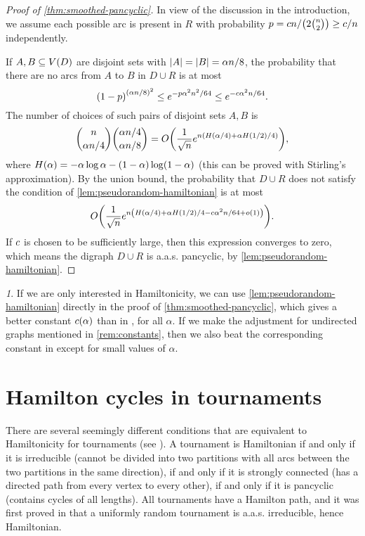 \documentclass[11pt,english]{article}
\theoremstyle{plain}
\theoremstyle{definition}
\theoremstyle{definition}
\theoremstyle{plain}
\theoremstyle{plain}
\theoremstyle{plain}
\theoremstyle{plain}
\theoremstyle{remark}
\newtheorem{rem}[thm]{\protect\remarkname}
\theoremstyle{remark}
\let\originalleft\left
\let\originalright\right
\renewcommand{\left}{\mathopen{}\mathclose\bgroup\originalleft}
\renewcommand{\right}{\aftergroup\egroup\originalright}
\providecommand{\remarkname}{Remark}
\begin{document}
\begin{proof}
[Proof of \ref{thm:smoothed-pancyclic}]In view of the discussion
in the introduction, we assume each possible arc is present in $R$
with probability $p=\cdi n/\left(2{n \choose 2}\right)\ge\cdi/n$ independently.

If $A,B\subseteq V\left(D\right)$ are disjoint sets with $\left|A\right|=\left|B\right|=\alpha n/8$,
the probability that there are no arcs from $A$ to $B$ in $D\cup R$
is at most
\[
\left(1-p\right)^{\left(\alpha n/8\right)^{2}}\le e^{-p\alpha^{2}n^{2}/64}\le e^{-\cdi\alpha^{2}n/64}.
\]
The number of choices of such pairs of disjoint sets $A,B$ is
\[
{n \choose \alpha n/4}{\alpha n/4 \choose \alpha n/8}=O\left(\frac{1}{\sqrt{n}}e^{n\left(H\left(\alpha/4\right)+\alpha H\left(1/2\right)/4\right)}\right),
\]
where $H\left(\alpha\right)=-\alpha\log\alpha-\left(1-\alpha\right)\log\left(1-\alpha\right)$
(this can be proved with Stirling's approximation). By the union bound,
the probability that $D\cup R$ does not satisfy the condition of
\ref{lem:pseudorandom-hamiltonian} is at most
\[
O\left(\frac{1}{\sqrt{n}}e^{n\left(H\left(\alpha/4\right)+\alpha H\left(1/2\right)/4-\cdi\alpha^{2}n/64+o\left(1\right)\right)}\right).
\]
If $c$ is chosen to
be sufficiently large, then this expression converges to zero, which means the digraph $D\cup R$ is a.a.s. pancyclic, by \ref{lem:pseudorandom-hamiltonian}.\end{proof}
\begin{rem}
If we are only interested in Hamiltonicity, we can use \ref{lem:pseudorandom-hamiltonian}
directly in the proof of \ref{thm:smoothed-pancyclic}, which gives
a better constant $\cdi\left(\alpha\right)$ than in \cite[Theorem~3]{BFM03},
for all $\alpha$. If we make the adjustment for undirected graphs
mentioned in \ref{rem:constants}, then we also beat the corresponding
constant in \cite[Theorem~1]{BFM03} except for small values of $\alpha$.
\end{rem}

\section{\label{sec:tournaments}Hamilton cycles in tournaments}

There are several seemingly different conditions that are equivalent
to Hamiltonicity for tournaments (see \cite[Chapters~2-3]{Moo68}).
A tournament is Hamiltonian if and only if it is irreducible (cannot
be divided into two partitions with all arcs between the two partitions
in the same direction), if and only if it is strongly connected (has
a directed path from every vertex to every other), if and only if
it is pancyclic (contains cycles of all lengths). All tournaments
have a Hamilton path, and it was first proved in \cite{MM62} that
a uniformly random tournament is a.a.s. irreducible, hence Hamiltonian.
\end{document}
